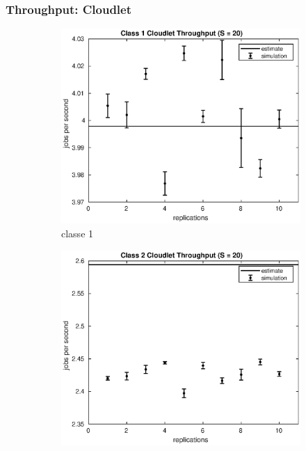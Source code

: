 \subsubsection{Throughput: Cloudlet}
%
\begin{figure}[!h]
\centering
%
\begin{subfigure}[t]{0.49\textwidth}
\includegraphics[width=\textwidth]{figures/simul/20_500K_x1clet}
\caption{classe 1}
\label{20_x1clet}
\end{subfigure}
%
\begin{subfigure}[t]{0.49\textwidth}
\includegraphics[width=\textwidth]{figures/simul/20_500K_x2clet}

\end{subfigure}
\end{figure}
